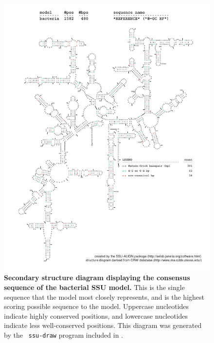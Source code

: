 \begin{figure}
\begin{center}
\includegraphics[width=5.7in]{Figures/bacteria-0p1-rf}
\end{center}
\caption[Secondary structure diagram displaying the consensus sequence
  of the bacterial SSU model]{\textbf{Secondary structure diagram displaying the
  consensus sequence of the bacterial SSU model.} 
  This is the single sequence that the model 
  most closely represents, and is the highest scoring possible
  sequence to the model. Uppercase nucleotides indicate highly conserved positions,
  and lowercase nucleotides indicate less well-conserved positions.
  This diagram was generated by the {\tt
  ssu-draw} program included in .}
\label{fig:bacrf}
\end{figure}

